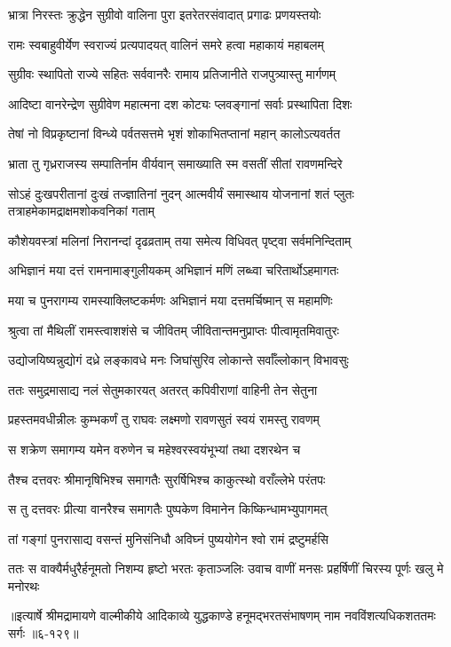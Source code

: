 \twolineshloka
{भ्रात्रा निरस्तः क्रुद्धेन सुग्रीवो वालिना पुरा}
{इतरेतरसंवादात् प्रगाढः प्रणयस्तयोः} %

\twolineshloka
{रामः स्वबाहुवीर्येण स्वराज्यं प्रत्यपादयत्}
{वालिनं समरे हत्वा महाकायं महाबलम्} %

\twolineshloka
{सुग्रीवः स्थापितो राज्ये सहितः सर्ववानरैः}
{रामाय प्रतिजानीते राजपुत्र्यास्तु मार्गणम्} %

\twolineshloka
{आदिष्टा वानरेन्द्रेण सुग्रीवेण महात्मना}
{दश कोट्यः प्लवङ्गानां सर्वाः प्रस्थापिता दिशः} %

\twolineshloka
{तेषां नो विप्रकृष्टानां विन्ध्ये पर्वतसत्तमे}
{भृशं शोकाभितप्तानां महान् कालोऽत्यवर्तत} %

\twolineshloka
{भ्राता तु गृध्रराजस्य सम्पातिर्नाम वीर्यवान्}
{समाख्याति स्म वसतीं सीतां रावणमन्दिरे} %

\threelineshloka
{सोऽहं दुःखपरीतानां दुःखं तज्ज्ञातिनां नुदन्}
{आत्मवीर्यं समास्थाय योजनानां शतं प्लुतः}
{तत्राहमेकामद्राक्षमशोकवनिकां गताम्} %

\twolineshloka
{कौशेयवस्त्रां मलिनां निरानन्दां दृढव्रताम्}
{तया समेत्य विधिवत् पृष्ट्वा सर्वमनिन्दिताम्} %

\twolineshloka
{अभिज्ञानं मया दत्तं रामनामाङ्गुलीयकम्}
{अभिज्ञानं मणिं लब्ध्वा चरितार्थोऽहमागतः} %

\twolineshloka
{मया च पुनरागम्य रामस्याक्लिष्टकर्मणः}
{अभिज्ञानं मया दत्तमर्चिष्मान् स महामणिः} %

\twolineshloka
{श्रुत्वा तां मैथिलीं रामस्त्वाशशंसे च जीवितम्}
{जीवितान्तमनुप्राप्तः पीत्वामृतमिवातुरः} %

\twolineshloka
{उद्योजयिष्यन्नुद्योगं दध्रे लङ्कावधे मनः}
{जिघांसुरिव लोकान्ते सर्वाँल्लोकान् विभावसुः} %

\twolineshloka
{ततः समुद्रमासाद्य नलं सेतुमकारयत्}
{अतरत् कपिवीराणां वाहिनी तेन सेतुना} %

\twolineshloka
{प्रहस्तमवधीन्नीलः कुम्भकर्णं तु राघवः}
{लक्ष्मणो रावणसुतं स्वयं रामस्तु रावणम्} %

\twolineshloka
{स शक्रेण समागम्य यमेन वरुणेन च}
{महेश्वरस्वयंभूभ्यां तथा दशरथेन च} %

\twolineshloka
{तैश्च दत्तवरः श्रीमानृषिभिश्च समागतैः}
{सुरर्षिभिश्च काकुत्स्थो वराँल्लेभे परंतपः} %

\twolineshloka
{स तु दत्तवरः प्रीत्या वानरैश्च समागतैः}
{पुष्पकेण विमानेन किष्किन्धामभ्युपागमत्} %

\twolineshloka
{तां गङ्गां पुनरासाद्य वसन्तं मुनिसंनिधौ}
{अविघ्नं पुष्ययोगेन श्वो रामं द्रष्टुमर्हसि} %

\twolineshloka
{ततः स वाक्यैर्मधुरैर्हनूमतो निशम्य हृष्टो भरतः कृताञ्जलिः}
{उवाच वाणीं मनसः प्रहर्षिणीं चिरस्य पूर्णः खलु मे मनोरथः} %


॥इत्यार्षे श्रीमद्रामायणे वाल्मीकीये आदिकाव्ये युद्धकाण्डे हनूमद्भरतसंभाषणम् नाम नवविंशत्यधिकशततमः सर्गः ॥६-१२९॥
